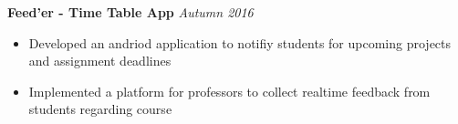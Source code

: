 \documentclass{article}
\begin{document}
\textbf{Feed'er - Time Table App} \hfill{\sl \small Autumn 2016}
  \vspace{1pt}\\
  \vspace{-17pt}
    \begin{itemize}[itemsep = -0.75 mm, leftmargin=*]
      \item Developed an andriod application to notifiy students for upcoming projects and assignment deadlines
      \item Implemented a platform for professors to collect realtime feedback from students regarding course
    \end{itemize}
\vspace{-10pt}

\end{document}
